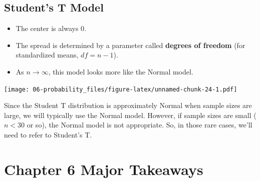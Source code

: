 \documentclass[
]{book}
\providecommand{\tightlist}{%
  \setlength{\itemsep}{0pt}\setlength{\parskip}{0pt}}
\begin{document}
\hypertarget{students-t-model}{%
\subsection{Student's T Model}\label{students-t-model}}

\begin{itemize}
\tightlist
\item
  The center is always 0.
\item
  The spread is determined by a parameter called \textbf{degrees of freedom} (for standardized means, \(df = n - 1\)).
\item
  As \(n\rightarrow\infty\), this model looks more like the Normal model.
\end{itemize}

\texttt{[image: 06-probability\_files/figure-latex/unnamed-chunk-24-1.pdf]}

Since the Student T distribution is approximately Normal when sample sizes are large, we will typically use the Normal model. However, if sample sizes are small (\(n<30\) or so), the Normal model is not appropriate. So, in those rare cases, we'll need to refer to Student's T.

\hypertarget{chapter-6-major-takeaways}{%
\section{Chapter 6 Major Takeaways}\label{chapter-6-major-takeaways}}
\end{document}
